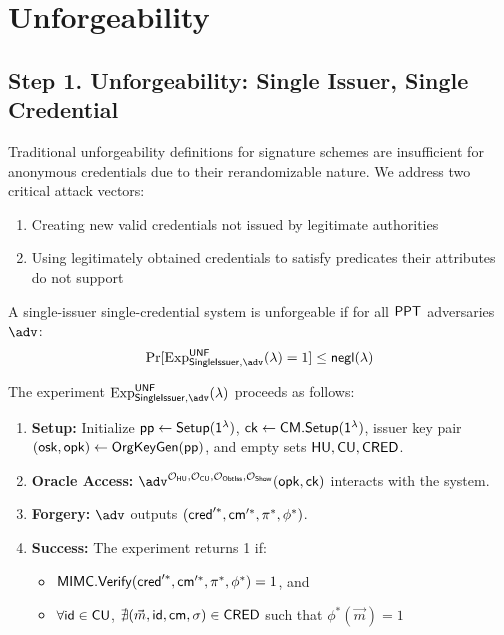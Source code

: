 \newpage
\section{Unforgeability}

\subsection{Step 1. Unforgeability: Single Issuer, Single Credential}

Traditional unforgeability definitions for signature schemes are insufficient for anonymous credentials due to their rerandomizable nature. We address two critical attack vectors:
\begin{enumerate}
\item Creating new valid credentials not issued by legitimate authorities
\item Using legitimately obtained credentials to satisfy predicates their attributes do not support
\end{enumerate}

\begin{definition}
A single-issuer single-credential system is unforgeable if for all $\mathsf{PPT}$ adversaries $\adv$:
\[
\Pr[\mathrm{Exp}^{\mathsf{UNF}}_{\mathsf{SingleIssuer}, \adv}(\lambda) = 1] \leq \negl(\lambda)
\]
\end{definition}

\noindent The experiment $\mathrm{Exp}^{\mathsf{UNF}}_{\mathsf{SingleIssuer}, \adv}(\lambda)$ proceeds as follows:

\begin{enumerate}
    \item \textbf{Setup:} Initialize $\mathsf{pp} \gets \mathsf{Setup}(\mathsf{1^{\lambda}})$, $\mathsf{ck} \gets \mathsf{CM.Setup}(\mathsf{1^{\lambda}})$, issuer key pair $(\mathsf{osk}, \mathsf{opk}) \gets \mathsf{OrgKeyGen}(\mathsf{pp})$, and empty sets $\mathsf{HU}, \mathsf{CU}, \mathsf{CRED}$.
    
    \item \textbf{Oracle Access:} $\adv^{\OHU, \OCU, \OOBTISS, \OSHOW}(\opk, \ck)$ interacts with the system.
    
    \item \textbf{Forgery:} $\adv$ outputs $(\mathsf{cred}'^*, \mathsf{cm}'^*, \pi^*, \phi^*)$.
    
    \item \textbf{Success:} The experiment returns 1 if:
    \begin{itemize}
        \item $\mathsf{MIMC.Verify}(\mathsf{cred}'^*, \mathsf{cm}'^*, \pi^*, \phi^*) = 1$, and
        \item $\forall \mathsf{id} \in \mathsf{CU}$, $\nexists (\vec{m}, \mathsf{id}, \mathsf{cm}, \sigma) \in \mathsf{CRED}$ such that $\phi^*(\vec{m}) = 1$
    \end{itemize}
\end{enumerate}


